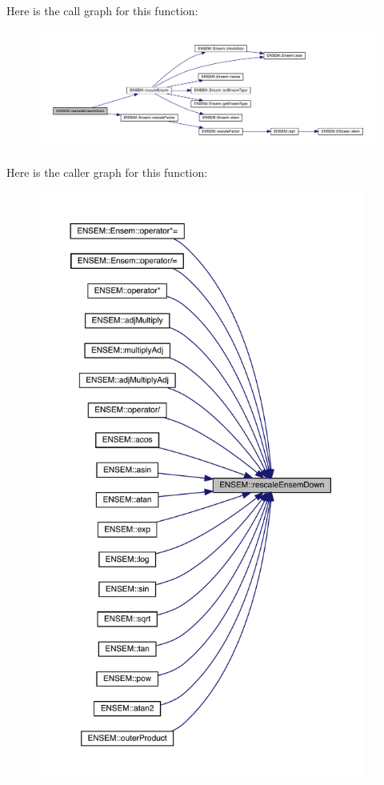Here is the call graph for this function\+:\nopagebreak
\begin{figure}[H]
\begin{center}
\leavevmode
\includegraphics[width=350pt]{d1/d9e/group__eensem_gae1ec6cc73aa72bf1f07360fa333487fe_cgraph}
\end{center}
\end{figure}
Here is the caller graph for this function\+:\nopagebreak
\begin{figure}[H]
\begin{center}
\leavevmode
\includegraphics[height=550pt]{d1/d9e/group__eensem_gae1ec6cc73aa72bf1f07360fa333487fe_icgraph}
\end{center}
\end{figure}
\mbox{\label{group__eensem_ga30c22a7d0685364385ca870e38bd9b3b}} 
